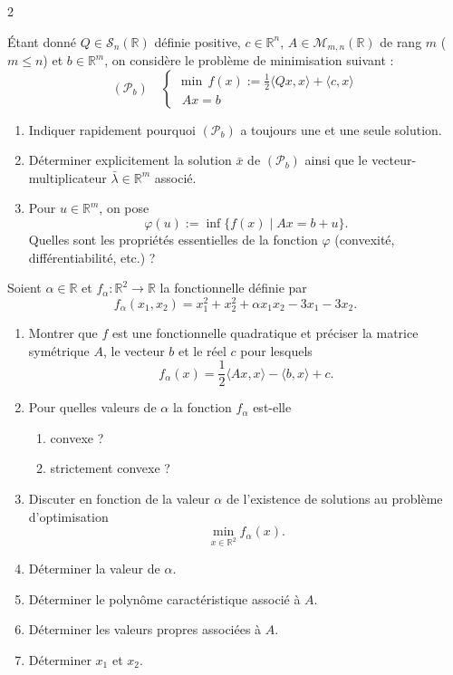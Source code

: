 \begin{multicols}{2}
\begin{exercice}
	Étant donné $Q \in \mathcal{S}_{n}(\mathbb{R})$ définie positive, $c \in \mathbb{R}^{n}$, $A \in \mathcal{M}_{m, n}(\mathbb{R})$ de rang $m$ ($m \leqslant n$) et $b \in \mathbb{R}^{m}$, on considère le problème de minimisation suivant :
	\[
	(\mathcal{P}_{b}) \quad
	\begin{cases}
	\min \, f(x) := \frac{1}{2} \langle Qx, x \rangle + \langle c, x \rangle \\
	\,\, Ax = b
	\end{cases}
	\]
	\begin{enumerate}[label=\arabic*.]
		\item Indiquer rapidement pourquoi $(\mathcal{P}_{b})$ a toujours une et une seule solution.
		\item Déterminer explicitement la solution $\bar{x}$ de $(\mathcal{P}_{b})$ ainsi que le vecteur-multiplicateur $\bar{\lambda} \in \mathbb{R}^{m}$ associé.
		\item Pour $u \in \mathbb{R}^{m}$, on pose
		\[
		\varphi(u) := \inf \{ f(x) \mid Ax = b + u \}.
		\]
		Quelles sont les propriétés essentielles de la fonction $\varphi$ (convexité, différentiabilité, etc.) ?
	\end{enumerate}
\end{exercice}

\begin{exercice}
	Soient $\alpha \in \mathbb{R}$ et $f_{\alpha} : \mathbb{R}^{2} \rightarrow \mathbb{R}$ la fonctionnelle définie par
	\[
	f_{\alpha}(x_{1}, x_{2}) = x_{1}^{2} + x_{2}^{2} + \alpha x_{1} x_{2} - 3x_{1} - 3x_{2}.
	\]
	\begin{enumerate}[label=\arabic*.]
		\item Montrer que $f$ est une fonctionnelle quadratique et préciser la matrice symétrique $A$, le vecteur $b$ et le réel $c$ pour lesquels
		\[
		f_{\alpha}(x) = \frac{1}{2} \langle Ax, x \rangle - \langle b, x \rangle + c.
		\]
		\item Pour quelles valeurs de $\alpha$ la fonction $f_{\alpha}$ est-elle
		\begin{enumerate}
			\item convexe ?
			\item strictement convexe ?
		\end{enumerate}
		\item Discuter en fonction de la valeur $\alpha$ de l'existence de solutions au problème d'optimisation
		\[
		\min_{x \in \mathbb{R}^{2}} f_{\alpha}(x).
		\]
		\item Déterminer la valeur de $\alpha$.
		\item Déterminer le polynôme caractéristique associé à $A$.
		\item Déterminer les valeurs propres associées à $A$.
		\item Déterminer $x_{1}$ et $x_{2}$.
	\end{enumerate}
\end{exercice}


\end{multicols}
